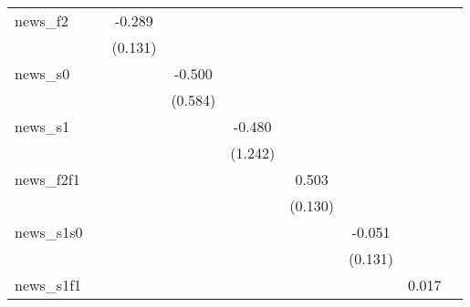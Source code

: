 {\begin{tabular}{l*{8}{c}}
\addlinespace
news\_f2     &                     &      -0.289\sym{**} &                     &                     &                     &                     &                     &                     \\
            &                     &     (0.131)         &                     &                     &                     &                     &                     &                     \\
\addlinespace
news\_s0     &                     &                     &      -0.500         &                     &                     &                     &                     &                     \\
            &                     &                     &     (0.584)         &                     &                     &                     &                     &                     \\
\addlinespace
news\_s1     &                     &                     &                     &      -0.480         &                     &                     &                     &                     \\
            &                     &                     &                     &     (1.242)         &                     &                     &                     &                     \\
\addlinespace
news\_f2f1   &                     &                     &                     &                     &       0.503\sym{***}&                     &                     &                     \\
            &                     &                     &                     &                     &     (0.130)         &                     &                     &                     \\
\addlinespace
news\_s1s0   &                     &                     &                     &                     &                     &      -0.051         &                     &                     \\
            &                     &                     &                     &                     &                     &     (0.131)         &                     &                     \\
\addlinespace
news\_s1f1   &                     &                     &                     &                     &                     &                     &       0.017         &                     \\

\end{tabular}}
